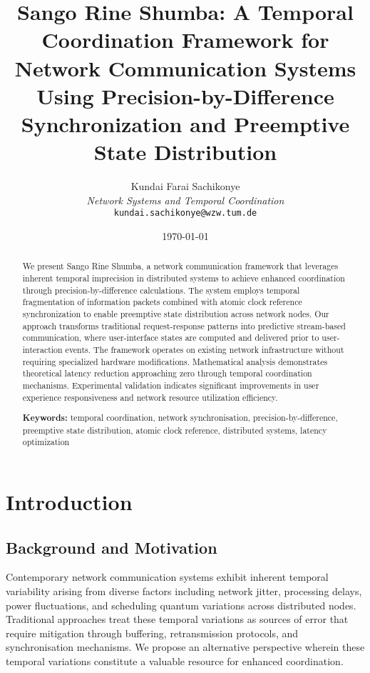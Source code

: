 \documentclass[12pt,a4paper]{article}
\title{\textbf{Sango Rine Shumba: A Temporal Coordination Framework for Network Communication Systems Using Precision-by-Difference Synchronization and Preemptive State Distribution}}
\author{
Kundai Farai Sachikonye\\
\textit{Network Systems and Temporal Coordination}\\
\texttt{kundai.sachikonye@wzw.tum.de}
}
\date{\today}
\begin{document}
\maketitle

\begin{abstract}
We present Sango Rine Shumba, a network communication framework that leverages inherent temporal imprecision in distributed systems to achieve enhanced coordination through precision-by-difference calculations. The system employs temporal fragmentation of information packets combined with atomic clock reference synchronization to enable preemptive state distribution across network nodes. Our approach transforms traditional request-response patterns into predictive stream-based communication, where user-interface states are computed and delivered prior to user-interaction events. The framework operates on existing network infrastructure without requiring specialized hardware modifications. Mathematical analysis demonstrates theoretical latency reduction approaching zero through temporal coordination mechanisms. Experimental validation indicates significant improvements in user experience responsiveness and network resource utilization efficiency.

\textbf{Keywords:} temporal coordination, network synchronisation, precision-by-difference, preemptive state distribution, atomic clock reference, distributed systems, latency optimization
\end{abstract}

\section{Introduction}

\subsection{Background and Motivation}

Contemporary network communication systems exhibit inherent temporal variability arising from diverse factors including network jitter, processing delays, power fluctuations, and scheduling quantum variations across distributed nodes. Traditional approaches treat these temporal variations as sources of error that require mitigation through buffering, retransmission protocols, and synchronisation mechanisms. We propose an alternative perspective wherein these temporal variations constitute a valuable resource for enhanced coordination.
\end{document}
